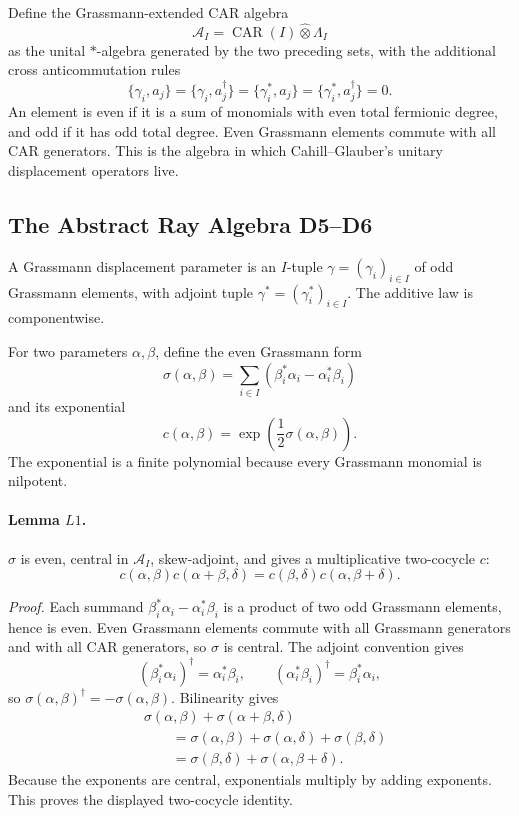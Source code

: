 Define the Grassmann-extended CAR algebra
\[
  \mathcal A_I=\operatorname{CAR}(I)\widehat\otimes\Lambda_I
\]
as the unital \(*\)-algebra generated by the two preceding sets, with the
additional cross anticommutation rules
\[
  \{\gamma_i,a_j\}=\{\gamma_i,a_j^\dagger\}
  =\{\gamma_i^*,a_j\}=\{\gamma_i^*,a_j^\dagger\}=0 .
\]
An element is even if it is a sum of monomials with even total fermionic
degree, and odd if it has odd total degree.  Even Grassmann elements commute
with all CAR generators.  This is the algebra in which Cahill--Glauber's
unitary displacement operators live.

\subsection{The Abstract Ray Algebra D5--D6}

A Grassmann displacement parameter is an \(I\)-tuple
\(\gamma=(\gamma_i)_{i\in I}\) of odd Grassmann elements, with adjoint tuple
\(\gamma^*=(\gamma_i^*)_{i\in I}\).  The additive law is componentwise.

For two parameters \(\alpha,\beta\), define the even Grassmann form
\[
  \sigma(\alpha,\beta)
  =
  \sum_{i\in I}(\beta_i^*\alpha_i-\alpha_i^*\beta_i)
\]
and its exponential
\[
  c(\alpha,\beta)=\exp\!\left(\frac12\sigma(\alpha,\beta)\right).
\]
The exponential is a finite polynomial because every Grassmann monomial is
nilpotent.

\paragraph{Lemma \(L1\).}
\(\sigma\) is even, central in \(\mathcal A_I\), skew-adjoint, and gives a
multiplicative two-cocycle \(c\):
\[
  c(\alpha,\beta)c(\alpha+\beta,\delta)
  =
  c(\beta,\delta)c(\alpha,\beta+\delta).
\]

\emph{Proof.}
Each summand \(\beta_i^*\alpha_i-\alpha_i^*\beta_i\) is a product of two odd
Grassmann elements, hence is even.  Even Grassmann elements commute with all
Grassmann generators and with all CAR generators, so \(\sigma\) is central.
The adjoint convention gives
\[
  (\beta_i^*\alpha_i)^\dagger=\alpha_i^*\beta_i,\qquad
  (\alpha_i^*\beta_i)^\dagger=\beta_i^*\alpha_i,
\]
so \(\sigma(\alpha,\beta)^\dagger=-\sigma(\alpha,\beta)\).  Bilinearity gives
\[
\begin{aligned}
&\sigma(\alpha,\beta)+\sigma(\alpha+\beta,\delta)\\
&\qquad =
  \sigma(\alpha,\beta)+\sigma(\alpha,\delta)+\sigma(\beta,\delta)\\
&\qquad =
  \sigma(\beta,\delta)+\sigma(\alpha,\beta+\delta).
\end{aligned}
\]
Because the exponents are central, exponentials multiply by adding exponents.
This proves the displayed two-cocycle identity.

